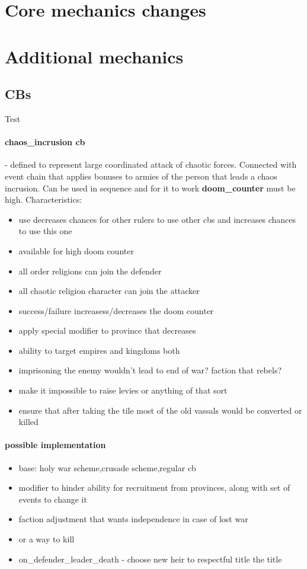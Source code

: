 \documentclass[10pt, english]{article}
\begin{document}
\newpage
\section{Core mechanics changes}
\section{Additional mechanics}
\subsection{CBs}
Test
\paragraph{chaos\_incrusion cb} - defined to represent large coordinated attack 
of chaotic forces.
Connected with event chain that applies bonuses to armies of the person that leads a 
chaos incrusion.
Can be used in sequence and for it to work \textbf{doom\_counter} must be high.
Characteristics:
\begin{itemize}
\item use decreases chances for other rulers to use other cbs and increases chances to use this one
\item available for high doom counter
\item all order religions can join the defender
\item all chaotic religion character can join the attacker
\item success/failure increasess/decreases the doom counter
\item apply special modifier to province that decreases 
\item ability to target empires and kingdoms both
\item imprisoning the enemy wouldn't lead to end of war? faction that rebels?
\item make it impossible to raise levies or anything of that sort
\item ensure that after taking the tile most of the old vassals would be converted or killed
\end{itemize}

\paragraph{possible implementation}
\begin{itemize}
\item base: holy war scheme,crusade scheme,regular cb
\item modifier to hinder ability for recruitment from provinces, along with set of events
      to change it
\item faction adjustment that wants independence in case of lost war
\item or a way to kill 
\item on\_defender\_leader\_death - choose new heir to respectful title the title
\end{itemize}
\end{document}
